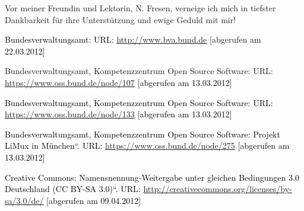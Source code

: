 \documentclass[a4paper]{article}
\newcommand\textstyleInternetlink[1]{\foreignlanguage{english}{\textcolor[rgb]{0.0,0.0,0.5019608}{#1}}}
\begin{document}
{
Vor meiner Freundin und Lektorin, N. Fresen, verneige ich mich in
tiefster Dankbarkeit f\"ur ihre Unterst\"utzung und ewige Geduld mit
mir!}



\bigskip


\bigskip

{
\textstyleInternetlink{\textcolor{black}{Bundesverwaltungsamt: URL:
}}\href{http://www.bva.bund.de/}{\textstyleInternetlink{http://www.bva.bund.de}}
[abgerufen\textstyleInternetlink{\textcolor{black}{ am 22.03.2012]}}}


\bigskip

{
Bundesverwaltungsamt, Kompetenzzentrum Open Source Software: URL:
\href{https://www.oss.bund.de/node/107}{\textstyleInternetlink{http}}\href{https://www.oss.bund.de/node/107}{\textstyleInternetlink{s://www.oss.bund.de/node/107}}
\foreignlanguage{english}{\textcolor{black}{[abgerufen am
13.03.2012]}}}


\bigskip

{
\textcolor{black}{Bundesverwaltungsamt, Kompetenzzentrum Open Source
Software: URL:
}\href{https://www.oss.bund.de/node/133}{\textstyleInternetlink{http}}\href{https://www.oss.bund.de/node/133}{\textstyleInternetlink{\foreignlanguage{ngerman}{s}}}\href{https://www.oss.bund.de/node/133}{\textstyleInternetlink{://www.oss.bund.de/node/133}}
\foreignlanguage{english}{\textcolor{black}{[abgerufen am
13.03.2012]}}}


\bigskip

{
\foreignlanguage{english}{\textcolor{black}{Bu}}\foreignlanguage{english}{\textcolor{black}{ndesverwaltungsamt,
Kompetenzzentrum}}\textcolor{black}{ Open Source
Software}\foreignlanguage{english}{\textcolor{black}{:
{\quotedblbase}Projekt LiMux in M\"unchen{\textquotedblleft}. URL:
}}\url{https://www.oss.bund.de/node/275}\textstyleInternetlink{\textcolor{black}{
}}\textstyleInternetlink{\textcolor{black}{[abgerufen am 13.03.2012]}}}


\bigskip

{
\textstyleInternetlink{\textcolor{black}{Creative Commons:
{\quotedblbase}Namensnennung-Weitergabe unter gleichen Bedingungen 3.0
Deutschland (CC BY-SA 3.0){\textquotedblleft}. URL:
}}\url{http://creativecommons.org/licenses/by-sa/3.0/de/}\textstyleInternetlink{\textcolor{black}{
[abgerufen am 09.04.2012]}}}
\end{document}

